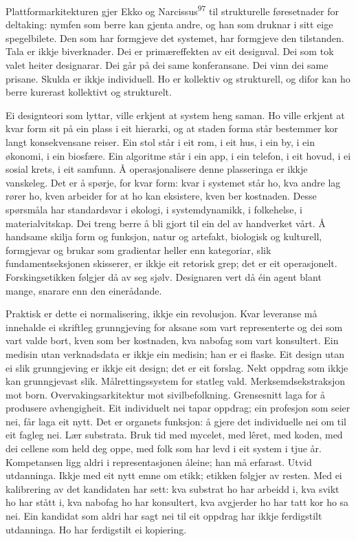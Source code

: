 \begin{widebody}
{Plattformarkitekturen gjer Ekko og Narcissus\textsuperscript{97} til strukturelle føresetnader for deltaking: nymfen som berre kan gjenta andre, og han som druknar i sitt eige spegelbilete. Den som har formgjeve det systemet, har formgjeve den tilstanden. Tala er ikkje biverknader. Dei er primæreffekten av eit designval. Dei som tok valet heiter designarar. Dei går på dei same konferansane. Dei vinn dei same prisane. Skulda er ikkje individuell. Ho er kollektiv og strukturell, og difor kan ho berre kurerast kollektivt og strukturelt.

Ei designteori som lyttar, ville erkjent at system heng saman. Ho ville erkjent at kvar form sit på ein plass i eit hierarki, og at staden forma står bestemmer kor langt konsekvensane reiser. Ein stol står i eit rom, i eit hus, i ein by, i ein økonomi, i ein biosfære. Ein algoritme står i ein app, i ein telefon, i eit hovud, i ei sosial krets, i eit samfunn. Å operasjonalisere denne plasseringa er ikkje vanskeleg. Det er å spørje, for kvar form: kvar i systemet står ho, kva andre lag rører ho, kven arbeider for at ho kan eksistere, kven ber kostnaden. Desse spørsmåla har standardsvar i økologi, i systemdynamikk, i folkehelse, i materialvitskap. Dei treng berre å bli gjort til ein del av handverket vårt. Å handsame skilja form og funksjon, natur og artefakt, biologisk og kulturell, formgjevar og brukar som gradientar heller enn kategoriar, slik fundamentseksjonen skisserer, er ikkje eit retorisk grep; det er eit operasjonelt. Forskingsetikken følgjer då av seg sjølv. Designaren vert då éin agent blant mange, snarare enn den einerådande.

Praktisk er dette ei normalisering, ikkje ein revolusjon. Kvar leveranse må innehalde ei skriftleg grunngjeving for aksane som vart representerte og dei som vart valde bort, kven som ber kostnaden, kva nabofag som vart konsultert. Ein medisin utan verknadsdata er ikkje ein medisin; han er ei flaske. Eit design utan ei slik grunngjeving er ikkje eit design; det er eit forslag. Nekt oppdrag som ikkje kan grunngjevast slik. Målrettingssystem for statleg vald. Merksemdsekstraksjon mot born. Overvakingsarkitektur mot sivilbefolkning. Grensesnitt laga for å produsere avhengigheit. Eit individuelt nei tapar oppdrag; ein profesjon som seier nei, får laga eit nytt. Det er organets funksjon: å gjere det individuelle nei om til eit fagleg nei. Lær substrata. Bruk tid med mycelet, med lêret, med koden, med dei cellene som held deg oppe, med folk som har levd i eit system i tjue år. Kompetansen ligg aldri i representasjonen åleine; han må erfarast. Utvid utdanninga. Ikkje med eit nytt emne om etikk; etikken følgjer av resten. Med ei kalibrering av det kandidaten har sett: kva substrat ho har arbeidd i, kva svikt ho har stått i, kva nabofag ho har konsultert, kva avgjerder ho har tatt kor ho sa nei. Ein kandidat som aldri har sagt nei til eit oppdrag har ikkje ferdigstilt utdanninga. Ho har ferdigstilt ei kopiering.

}
\end{widebody}
